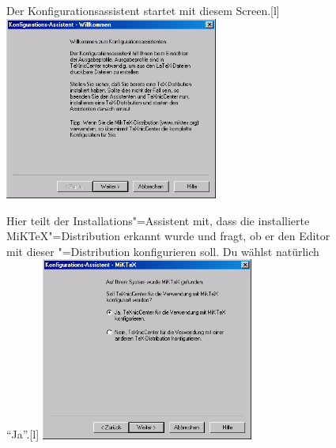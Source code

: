 \begin{figure}[hb]
	\begin{captionbeside}{Der Konfigurationsassistent  startet mit diesem Screen.}[l]
		\includegraphics[width=7cm]{images/konfiguration01.png}
	\end{captionbeside}
	\label{fig:konfiguration01}
\end{figure}

\begin{figure}[hb]
	\begin{captionbeside}{Hier teilt der Installations"=Assistent mit, dass die installierte MiKTeX"=Distribution erkannt wurde und fragt, ob er den Editor mit dieser \DMLLaTeX"=Distribution konfigurieren soll. Du wählst natürlich \enquote{Ja}.}[l]
		\includegraphics[width=7cm]{images/konfiguration02.png}
	\end{captionbeside}
	\label{fig:konfiguration02}
\end{figure}

